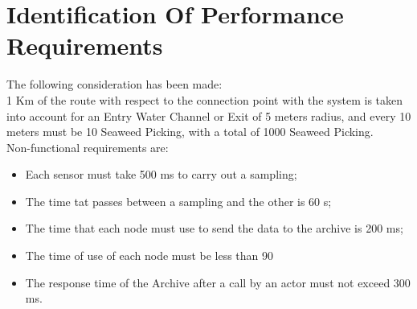 \newpage \chapter{\textbf{Identification Of Performance Requirements}}


The following consideration has been made: \\
1 Km of the route with respect to the connection point with the system is taken into account for an Entry Water Channel or Exit of 5 meters radius, and every 10 meters must be 10 Seaweed Picking, with a total of 1000 Seaweed Picking. \\
Non-functional requirements are:
\begin{itemize} 
\item Each sensor must take 500 ms to carry out a sampling;
\item The time tat passes between a sampling and the other is 60 s;
\item The time that each node must use to send the data to the archive 			is 200 ms;
\item The time of use of each node must be less than 90%
\item The response time of the Archive after a call by an actor must not 	exceed 300 ms.
\end{itemize} 
